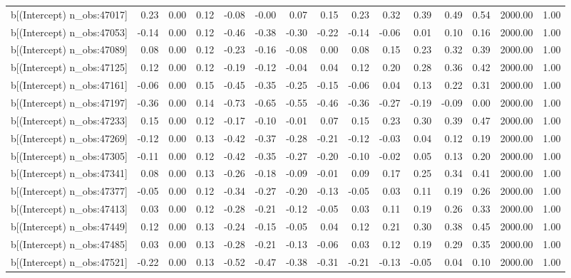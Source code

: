 \begin{table}[ht]
\begin{tabular}{rrrrrrrrrrrrrrr}
  b[(Intercept) n\_obs:47017] & 0.23 & 0.00 & 0.12 & -0.08 & -0.00 & 0.07 & 0.15 & 0.23 & 0.32 & 0.39 & 0.49 & 0.54 & 2000.00 & 1.00 \\ 
  b[(Intercept) n\_obs:47053] & -0.14 & 0.00 & 0.12 & -0.46 & -0.38 & -0.30 & -0.22 & -0.14 & -0.06 & 0.01 & 0.10 & 0.16 & 2000.00 & 1.00 \\ 
  b[(Intercept) n\_obs:47089] & 0.08 & 0.00 & 0.12 & -0.23 & -0.16 & -0.08 & 0.00 & 0.08 & 0.15 & 0.23 & 0.32 & 0.39 & 2000.00 & 1.00 \\ 
  b[(Intercept) n\_obs:47125] & 0.12 & 0.00 & 0.12 & -0.19 & -0.12 & -0.04 & 0.04 & 0.12 & 0.20 & 0.28 & 0.36 & 0.42 & 2000.00 & 1.00 \\ 
  b[(Intercept) n\_obs:47161] & -0.06 & 0.00 & 0.15 & -0.45 & -0.35 & -0.25 & -0.15 & -0.06 & 0.04 & 0.13 & 0.22 & 0.31 & 2000.00 & 1.00 \\ 
  b[(Intercept) n\_obs:47197] & -0.36 & 0.00 & 0.14 & -0.73 & -0.65 & -0.55 & -0.46 & -0.36 & -0.27 & -0.19 & -0.09 & 0.00 & 2000.00 & 1.00 \\ 
  b[(Intercept) n\_obs:47233] & 0.15 & 0.00 & 0.12 & -0.17 & -0.10 & -0.01 & 0.07 & 0.15 & 0.23 & 0.30 & 0.39 & 0.47 & 2000.00 & 1.00 \\ 
  b[(Intercept) n\_obs:47269] & -0.12 & 0.00 & 0.13 & -0.42 & -0.37 & -0.28 & -0.21 & -0.12 & -0.03 & 0.04 & 0.12 & 0.19 & 2000.00 & 1.00 \\ 
  b[(Intercept) n\_obs:47305] & -0.11 & 0.00 & 0.12 & -0.42 & -0.35 & -0.27 & -0.20 & -0.10 & -0.02 & 0.05 & 0.13 & 0.20 & 2000.00 & 1.00 \\ 
  b[(Intercept) n\_obs:47341] & 0.08 & 0.00 & 0.13 & -0.26 & -0.18 & -0.09 & -0.01 & 0.09 & 0.17 & 0.25 & 0.34 & 0.41 & 2000.00 & 1.00 \\ 
  b[(Intercept) n\_obs:47377] & -0.05 & 0.00 & 0.12 & -0.34 & -0.27 & -0.20 & -0.13 & -0.05 & 0.03 & 0.11 & 0.19 & 0.26 & 2000.00 & 1.00 \\ 
  b[(Intercept) n\_obs:47413] & 0.03 & 0.00 & 0.12 & -0.28 & -0.21 & -0.12 & -0.05 & 0.03 & 0.11 & 0.19 & 0.26 & 0.33 & 2000.00 & 1.00 \\ 
  b[(Intercept) n\_obs:47449] & 0.12 & 0.00 & 0.13 & -0.24 & -0.15 & -0.05 & 0.04 & 0.12 & 0.21 & 0.30 & 0.38 & 0.45 & 2000.00 & 1.00 \\ 
  b[(Intercept) n\_obs:47485] & 0.03 & 0.00 & 0.13 & -0.28 & -0.21 & -0.13 & -0.06 & 0.03 & 0.12 & 0.19 & 0.29 & 0.35 & 2000.00 & 1.00 \\ 
  b[(Intercept) n\_obs:47521] & -0.22 & 0.00 & 0.13 & -0.52 & -0.47 & -0.38 & -0.31 & -0.21 & -0.13 & -0.05 & 0.04 & 0.10 & 2000.00 & 1.00 \\ 

\end{tabular}
\end{table}
